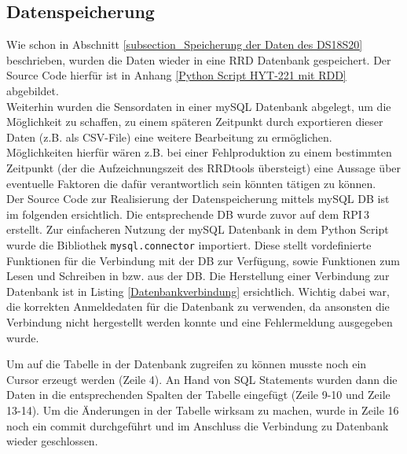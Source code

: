 \subsection{Datenspeicherung}
\label{subsection_Datenspeicherung_HYT221}
Wie schon in Abschnitt \ref{subsection_Speicherung der Daten des DS18S20} beschrieben, wurden die Daten wieder in eine RRD Datenbank gespeichert. Der Source Code hierfür ist in Anhang \ref{Python Script HYT-221 mit RDD} abgebildet.\\
Weiterhin wurden die Sensordaten in einer mySQL Datenbank abgelegt, um die Möglichkeit zu schaffen, zu einem späteren Zeitpunkt durch exportieren dieser Daten (z.B. als CSV-File) eine weitere Bearbeitung zu ermöglichen. Möglichkeiten hierfür wären z.B. bei einer Fehlproduktion zu einem bestimmten Zeitpunkt (der die Aufzeichnungszeit des RRDtools übersteigt) eine Aussage über eventuelle Faktoren die dafür verantwortlich sein könnten tätigen zu können.\\
Der Source Code zur Realisierung der Datenspeicherung mittels mySQL DB ist im folgenden ersichtlich. Die entsprechende DB wurde zuvor auf dem \ac{RPI}\,3 erstellt. Zur einfacheren Nutzung der mySQL Datenbank in dem Python Script wurde die Bibliothek \texttt{mysql.connector} importiert. Diese stellt vordefinierte Funktionen für die Verbindung mit der DB zur Verfügung, sowie Funktionen zum Lesen und Schreiben in bzw. aus der DB. Die Herstellung einer Verbindung zur Datenbank ist in Listing \ref{Datenbankverbindung} ersichtlich. Wichtig dabei war, die korrekten Anmeldedaten für die Datenbank zu verwenden, da ansonsten die Verbindung nicht hergestellt werden konnte und eine Fehlermeldung ausgegeben wurde.



Um auf die Tabelle in der Datenbank zugreifen zu können musste noch ein Cursor erzeugt werden (Zeile 4). An Hand von SQL Statements wurden dann die Daten in die entsprechenden Spalten der Tabelle eingefügt (Zeile 9-10 und Zeile 13-14). Um die Änderungen in der Tabelle wirksam zu machen, wurde in Zeile 16 noch ein commit durchgeführt und im Anschluss die Verbindung zu Datenbank wieder geschlossen.



